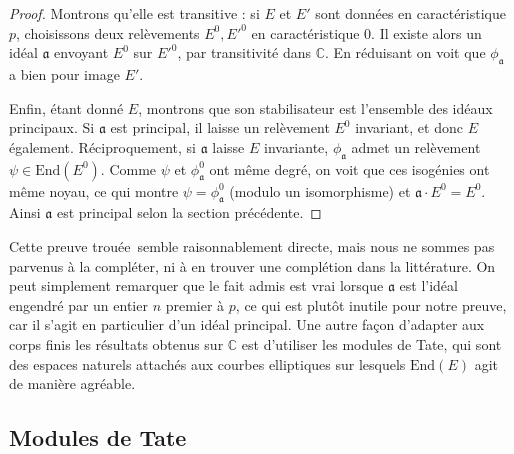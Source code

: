 \documentclass[11pt,a4paper]{article}
\newcommand{\C}{\mathbb{C}}
\renewcommand{\O}{\mathcal{O}}
\newcommand{\End}{\mathrm{End}}
\renewcommand{\frak}{\mathfrak}
\renewcommand{\v}{\vspace{5mm}}
\theoremstyle{definition}
\begin{document}
\begin{proof}

Montrons qu'elle est transitive : si $E$ et $E'$ sont données en caractéristique $p$, choisissons deux relèvements $E^0, E'^0$ en caractéristique 0. Il existe alors un idéal $\frak a$ envoyant $E^0$ sur $E'^0$, par transitivité dans $\C$. En réduisant on voit que $\phi_{\frak a}$ a bien pour image $E'$.

Enfin, étant donné $E$, montrons que son stabilisateur est l'ensemble des idéaux principaux. Si $\frak a$ est principal, il laisse un relèvement $E^0$ invariant, et donc $E$ également. Réciproquement, si $\frak a$ laisse $E$ invariante, %
%
%
$\phi_{\frak a}$ admet un relèvement $\psi\in \End(E^0)$. Comme $\psi$ et $\phi_{\frak a}^0$ ont même degré, on voit que ces isogénies ont même noyau, ce qui montre $\psi=\phi_{\frak a}^0$ (modulo un isomorphisme) et $\frak a\cdot E^0 = E^0$. Ainsi $\frak a$ est principal selon la section précédente.
\end{proof}
\v

Cette preuve \og trouée\fg\ semble raisonnablement directe, mais nous ne sommes pas parvenus à la compléter, ni à en trouver une complétion dans la littérature. On peut simplement remarquer que le fait admis est vrai lorsque $\frak a$ est l'idéal engendré par un entier $n$ premier à $p$, ce qui est plutôt inutile pour notre preuve, car il s'agit en particulier d'un idéal principal. Une autre façon d'adapter aux corps finis les résultats obtenus sur $\C$ est d'utiliser les modules de Tate, qui sont des espaces naturels attachés aux courbes elliptiques sur lesquels $\End(E)$ agit de manière agréable.


\subsection{Modules de Tate}
\end{document}
